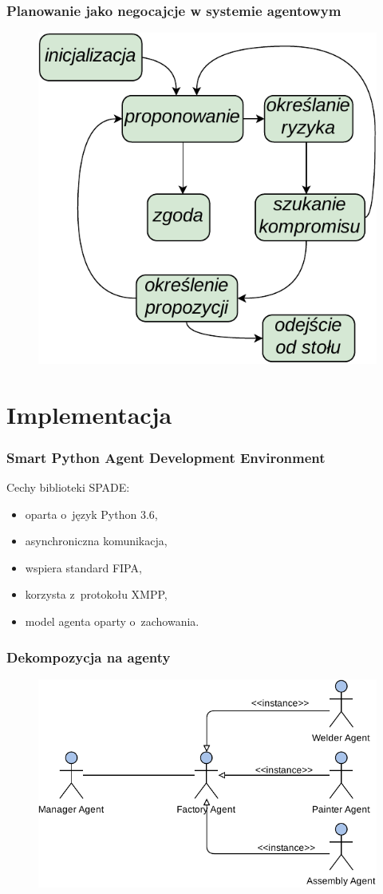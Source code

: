 \documentclass{beamer}
\begin{document}
\begin{frame}
    \frametitle{Planowanie jako negocajcje w systemie agentowym}
    \begin{figure}
        \centering
        \includegraphics[width=0.6\columnwidth]{figures/SAG-Negotiation-Prezentacja.pdf}
        \label{fig:negocjacje}
    \end{figure}
\end{frame}

\section{Implementacja}
\begin{frame}
    \frametitle{Smart Python Agent Development Environment}
    Cechy biblioteki SPADE:
    \begin{itemize}
        \item oparta o~język Python 3.6,
        \item asynchroniczna komunikacja,
        \item wspiera standard FIPA,
        \item korzysta z~protokołu XMPP,
        \item model agenta oparty o~zachowania.
    \end{itemize}
\end{frame}

\begin{frame}
    \frametitle{Dekompozycja na agenty}
    \begin{figure}
        \centering
        \includegraphics[width=0.95\columnwidth]{figures/SAG-Agents.pdf}
        \label{fig:agenci}
    \end{figure}
\end{frame}
\end{document}
